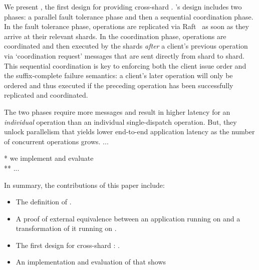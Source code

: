 We present \sys{}, the first design for providing cross-shard \mdl{}.
\sys{}'s design includes two phases: a parallel fault tolerance phase and then a sequential coordination phase.
In the fault tolerance phase, operations are replicated via Raft~\cite{raft} as soon as they arrive at their relevant shards.
In the coordination phase, operations are coordinated and then executed by the shards \textit{after} a client's previous operation via `coordination request' messages that are sent directly from shard to shard.
This sequential coordination is key to enforcing both the client issue order and the suffix-complete failure semantics:
a client's later operation will only be ordered and thus executed if the preceding operation has been successfully replicated and coordinated.

The two phases require more messages and result in higher latency for an \textit{individual} operation than an individual single-dispatch operation.
But, they unlock parallelism that yields lower end-to-end application latency as the number of concurrent operations grows.
...

%



* we implement and evaluate \sys{}\\
** ...

In summary, the contributions of this paper include:
\begin{itemize}[leftmargin=*]
\item The definition of \mdllong{}.
\item A proof of external equivalence between an application running on \sdl{} and a transformation of it running on \mdl{}.
\item The first design for cross-shard \mdl{}: \sys{}.
\item An implementation and evaluation of \sys{} that shows 
\end{itemize}
